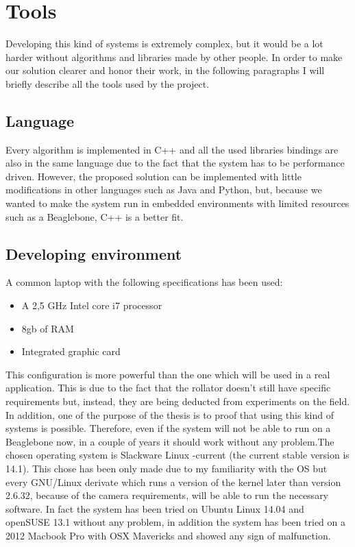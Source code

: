 \chapter{Tools}
Developing this kind of systems is extremely complex, but it would be a lot harder without algorithms and libraries made by other people.
In order to make our solution clearer and honor their work, in the following paragraphs I will briefly describe all the tools used by the project.

\section{Language}
Every algorithm is implemented in C++ and all the used libraries bindings are also in the same language due to the fact that the system has to be performance driven. However, the proposed solution can be implemented with little modifications in other languages such as Java and Python, but, because we wanted to make the system run in embedded environments with limited resources such as a Beaglebone, C++ is a better fit.        

\section{Developing environment}
A common laptop with the following specifications has been used:
\begin{itemize}
  \item A 2,5 GHz Intel core i7 processor
  \item 8gb of RAM
  \item Integrated graphic card
\end{itemize}
This configuration is more powerful than the one which will be used in a real application. This is due to the fact that the rollator doesn't still have specific requirements but, instead, they are being deducted from experiments on the field. In addition, one of the purpose of the thesis is to proof that using this kind of systems is possible. Therefore, even if the system will not be able to run on a Beaglebone now, in a couple of years it should work without any problem.The chosen operating system is Slackware Linux -current (the current stable version is 14.1). This chose has been only made due to my familiarity with the OS but every GNU/Linux derivate which runs a version of the kernel later than version 2.6.32, because of the camera requirements, will be able to run the necessary software.
In fact the system has been tried on Ubuntu Linux 14.04 and openSUSE 13.1 without any problem, in addition the system has been tried on a 2012 Macbook Pro with OSX Mavericks and showed any sign of malfunction. 


